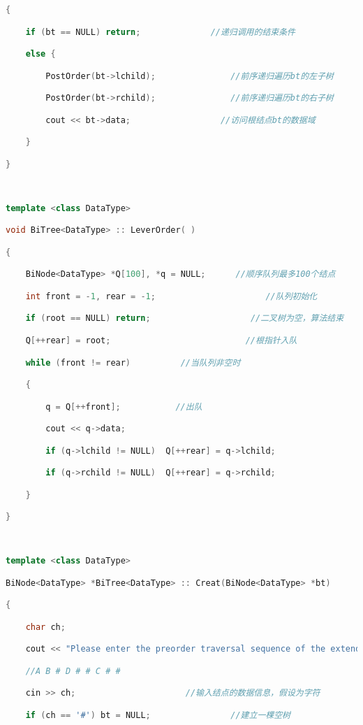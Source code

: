 \begin{lstlisting}[language=C++]
{

    if (bt == NULL) return;              //递归调用的结束条件

    else {

        PostOrder(bt->lchild);               //前序递归遍历bt的左子树

        PostOrder(bt->rchild);               //前序递归遍历bt的右子树

        cout << bt->data;                  //访问根结点bt的数据域  

    }

}

  

template <class DataType>

void BiTree<DataType> :: LeverOrder( )

{

    BiNode<DataType> *Q[100], *q = NULL;      //顺序队列最多100个结点

    int front = -1, rear = -1;                      //队列初始化

    if (root == NULL) return;                    //二叉树为空，算法结束

    Q[++rear] = root;                           //根指针入队

    while (front != rear)          //当队列非空时

    {

        q = Q[++front];           //出队

        cout << q->data;  

        if (q->lchild != NULL)  Q[++rear] = q->lchild;

        if (q->rchild != NULL)  Q[++rear] = q->rchild;

    }  

}

  

template <class DataType>

BiNode<DataType> *BiTree<DataType> :: Creat(BiNode<DataType> *bt)

{

    char ch;

    cout << "Please enter the preorder traversal sequence of the extended binary tree, one character at a time:";

    //A B # D # # C # #

    cin >> ch;                      //输入结点的数据信息，假设为字符

    if (ch == '#') bt = NULL;                //建立一棵空树


\end{lstlisting}
